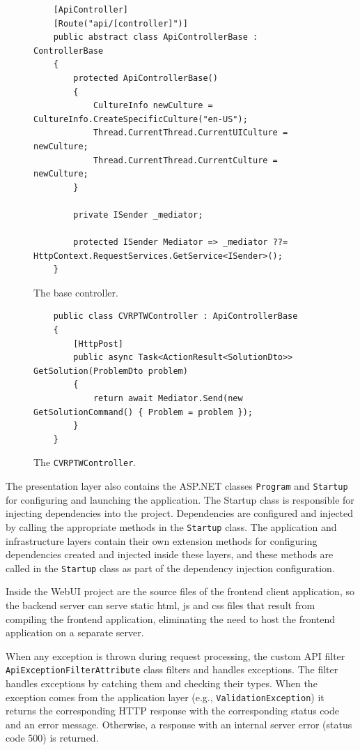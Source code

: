 \documentclass[a4paper,twoside,12pt]{book}
\begin{document}
\begin{figure}[htbp]
\centering
\begin{lstlisting}
    [ApiController]
    [Route("api/[controller]")]
    public abstract class ApiControllerBase : ControllerBase
    {
        protected ApiControllerBase()
        {
            CultureInfo newCulture = CultureInfo.CreateSpecificCulture("en-US");
            Thread.CurrentThread.CurrentUICulture = newCulture;
            Thread.CurrentThread.CurrentCulture = newCulture;
        }

        private ISender _mediator;

        protected ISender Mediator => _mediator ??= HttpContext.RequestServices.GetService<ISender>();
    }
\end{lstlisting}
\caption{The base controller.}
\label{fig:apiBase}
\end{figure}

\begin{figure} [htbp]
\centering
\begin{lstlisting}
    public class CVRPTWController : ApiControllerBase
    {
        [HttpPost]
        public async Task<ActionResult<SolutionDto>> GetSolution(ProblemDto problem)
        {
            return await Mediator.Send(new GetSolutionCommand() { Problem = problem });
        }
    }
\end{lstlisting}
\caption{The \lstinline{CVRPTWController}.}
\label{fig:controller}
\end{figure}

The presentation layer also contains the ASP.NET classes \lstinline{Program} and \lstinline{Startup} for configuring and launching the application. The {Startup} class is responsible for injecting dependencies into the project. Dependencies are configured and injected by calling the appropriate methods in the \lstinline{Startup} class. The application and infrastructure layers contain their own extension methods for configuring dependencies created and injected inside these layers, and these methods are called in the \lstinline{Startup} class as part of the dependency injection configuration.

Inside the WebUI project are the source files of the frontend client application, so the backend server can serve static html, js and css files that result from compiling the frontend application, eliminating the need to host the frontend application on a separate server.

When any exception is thrown during request processing, the custom API filter \lstinline{ApiExceptionFilterAttribute} class filters and handles exceptions. The filter handles exceptions by catching them and checking their types. When the exception comes from the application layer (e.g., \lstinline{ValidationException}) it returns the corresponding HTTP response with the corresponding status code and an error message. Otherwise, a response with an internal server error (status code 500) is returned. 
\end{document}
